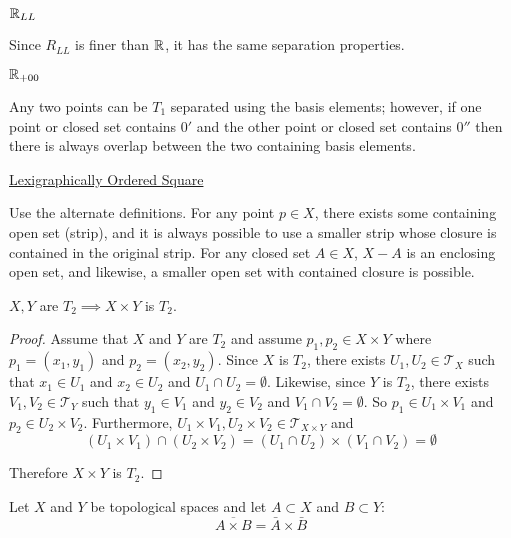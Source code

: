 \documentclass[letterpaper,12pt,fleqn]{article}
\newcommand{\T}{\mathscr{T}}
\begin{document}
\begin{example}[Exercise 4.13]
  \underline{\(\mathbb{R}_{LL}\)}

  Since \(R_{LL}\) is finer than \(\mathbb{R}\), it has the same separation properties.

  \underline{\(\mathbb{R}_{+00}\)}

  Any two points can be \(T_1\) separated using the basis elements; however, if one point or closed set contains
  \(0'\) and the other point or closed set contains \(0''\) then there is always overlap between the two containing
  basis elements.

  \underline{Lexigraphically Ordered Square}

  Use the alternate definitions.  For any point \(p\in X\), there exists some containing open set (strip), and it is
  always possible to use a smaller strip whose closure is contained in the original strip.  For any closed set
  \(A\in X\), \(X-A\) is an enclosing open set, and likewise, a smaller open set with contained closure is possible.
\end{example}

\begin{theorem}[4.16]
  \(X,Y\) are \(T_2\implies X\times Y\) is \(T_2\).
\end{theorem}

\begin{proof}
  Assume that \(X\) and \(Y\) are \(T_2\) and assume \(p_1,p_2\in X\times Y\) where \(p_1=(x_1,y_1)\) and
  \(p_2=(x_2,y_2)\).  Since \(X\) is \(T_2\), there exists \(U_1,U_2\in\T_X\) such that \(x_1\in U_1\) and
  \(x_2\in U_2\) and \(U_1\cap U_2=\emptyset\).  Likewise, since \(Y\) is \(T_2\), there exists \(V_1,V_2\in\T_Y\)
  such that \(y_1\in V_1\) and \(y_2\in V_2\) and \(V_1\cap V_2=\emptyset\).  So \(p_1\in U_1\times V_1\) and
  \(p_2\in U_2\times V_2\).  Furthermore, \(U_1\times V_1,U_2\times V_2\in\T_{X\times Y}\) and
  \[(U_1\times V_1)\cap(U_2\times V_2)=(U_1\cap U_2)\times(V_1\cap V_2)=\emptyset\]

  Therefore \(X\times Y\) is \(T_2\).
\end{proof}

\begin{lemma}
  Let \(X\) and \(Y\) be topological spaces and let \(A\subset X\) and \(B\subset Y\):
  \[\overline{A\times B}=\bar{A}\times\bar{B}\]
\end{lemma}
\end{document}
